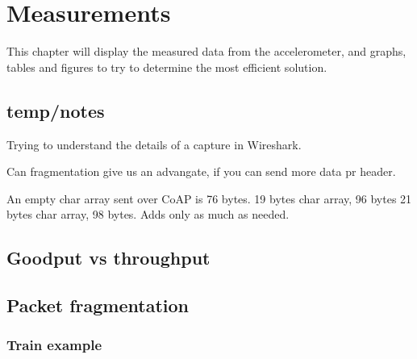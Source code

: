 \chapter{Measurements}
\label{chp:measurements2}

This chapter will display the measured data from the accelerometer, and graphs, tables and figures to try to determine the most efficient solution. 

\section{temp/notes}

Trying to understand the details of a capture in Wireshark. 

Can fragmentation give us an advangate, if you can send more data pr header. 

An empty char array sent over CoAP is 76 bytes. 
19 bytes char array, 96 bytes
21 bytes char array, 98 bytes. Adds only as much as needed. 
 

\section{Goodput vs throughput}

\section{Packet fragmentation}



\subsection{Train example}





